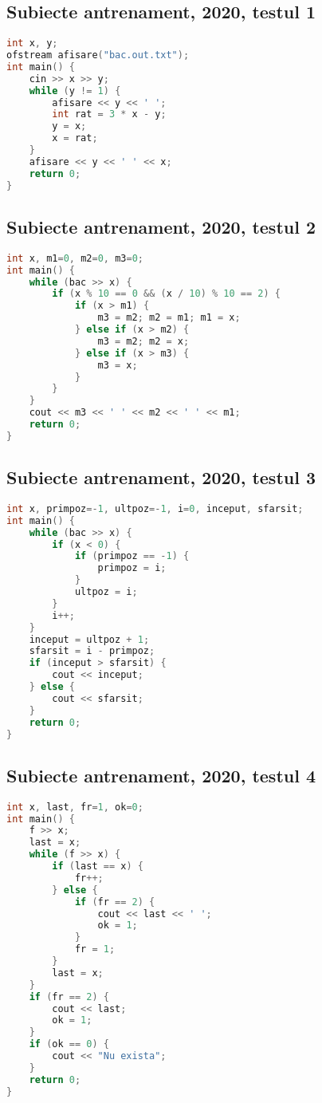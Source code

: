 \documentclass[10pt, a4paper, twocolumn]{article}
\begin{document}
\subsection*{Subiecte antrenament, 2020, testul 1}
\begin{lstlisting}[language=C++]
int x, y;
ofstream afisare("bac.out.txt");
int main() {
    cin >> x >> y;
    while (y != 1) {
        afisare << y << ' ';
        int rat = 3 * x - y;
        y = x;
        x = rat;
    }
    afisare << y << ' ' << x;
    return 0;
}
\end{lstlisting}


\subsection*{Subiecte antrenament, 2020, testul 2}
\begin{lstlisting}[language=C++]
int x, m1=0, m2=0, m3=0;
int main() {
    while (bac >> x) {
        if (x % 10 == 0 && (x / 10) % 10 == 2) {
            if (x > m1) {
                m3 = m2; m2 = m1; m1 = x;
            } else if (x > m2) {
                m3 = m2; m2 = x;
            } else if (x > m3) {
                m3 = x;
            }
        }
    }
    cout << m3 << ' ' << m2 << ' ' << m1;
    return 0;
}
\end{lstlisting}
\vspace{2cm}

\subsection*{Subiecte antrenament, 2020, testul 3}
\begin{lstlisting}[language=C++]
int x, primpoz=-1, ultpoz=-1, i=0, inceput, sfarsit;
int main() {
    while (bac >> x) {
        if (x < 0) {
            if (primpoz == -1) {
                primpoz = i;
            }
            ultpoz = i;
        }
        i++;
    }
    inceput = ultpoz + 1;
    sfarsit = i - primpoz;
    if (inceput > sfarsit) {
        cout << inceput;
    } else {
        cout << sfarsit;
    }
    return 0;
}
\end{lstlisting}


\subsection*{Subiecte antrenament, 2020, testul 4}
\begin{lstlisting}[language=C++]
int x, last, fr=1, ok=0;
int main() {
    f >> x;
    last = x;
    while (f >> x) {
        if (last == x) {
            fr++;
        } else {
            if (fr == 2) {
                cout << last << ' ';
                ok = 1;
            }
            fr = 1;
        }
        last = x;
    }
    if (fr == 2) {
        cout << last;
        ok = 1;
    }
    if (ok == 0) {
        cout << "Nu exista";
    }
    return 0;
}
\end{lstlisting}
\end{document}
